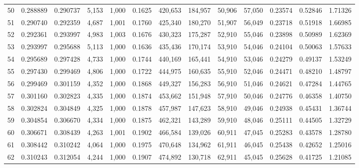 \begin{tabular}{rrrrrrrrrrrrr}
50  &  0.288889 &  0.290737 &   5,153 &  1,000 &                                     0.1625 &  420,653 &  184,957 &   50,906 &   57,050 &  0.23574 &  0.52846 &  1.71326 \\
51  &  0.290740 &  0.292359 &   4,687 &  1,001 &                                     0.1760 &  425,340 &  180,270 &   51,907 &   56,049 &  0.23718 &  0.51918 &  1.66985 \\
52  &  0.292361 &  0.293997 &   4,983 &  1,003 &                                     0.1676 &  430,323 &  175,287 &   52,910 &   55,046 &  0.23898 &  0.50989 &  1.62369 \\
53  &  0.293997 &  0.295688 &   5,113 &  1,000 &                                     0.1636 &  435,436 &  170,174 &   53,910 &   54,046 &  0.24104 &  0.50063 &  1.57633 \\
54  &  0.295689 &  0.297428 &   4,733 &  1,000 &                                     0.1744 &  440,169 &  165,441 &   54,910 &   53,046 &  0.24279 &  0.49137 &  1.53249 \\
55  &  0.297430 &  0.299469 &   4,806 &  1,000 &                                     0.1722 &  444,975 &  160,635 &   55,910 &   52,046 &  0.24471 &  0.48210 &  1.48797 \\
56  &  0.299469 &  0.301159 &   4,352 &  1,000 &                                     0.1868 &  449,327 &  156,283 &   56,910 &   51,046 &  0.24621 &  0.47284 &  1.44765 \\
57  &  0.301160 &  0.302823 &   4,335 &  1,000 &                                     0.1874 &  453,662 &  151,948 &   57,910 &   50,046 &  0.24776 &  0.46358 &  1.40750 \\
58  &  0.302824 &  0.304849 &   4,325 &  1,000 &                                     0.1878 &  457,987 &  147,623 &   58,910 &   49,046 &  0.24938 &  0.45431 &  1.36744 \\
59  &  0.304854 &  0.306670 &   4,334 &  1,000 &                                     0.1875 &  462,321 &  143,289 &   59,910 &   48,046 &  0.25111 &  0.44505 &  1.32729 \\
60  &  0.306671 &  0.308439 &   4,263 &  1,001 &                                     0.1902 &  466,584 &  139,026 &   60,911 &   47,045 &  0.25283 &  0.43578 &  1.28780 \\
61  &  0.308442 &  0.310242 &   4,064 &  1,000 &                                     0.1975 &  470,648 &  134,962 &   61,911 &   46,045 &  0.25438 &  0.42652 &  1.25016 \\
62  &  0.310243 &  0.312054 &   4,244 &  1,000 &                                     0.1907 &  474,892 &  130,718 &   62,911 &   45,045 &  0.25628 &  0.41725 &  1.21085 \\

\end{tabular}
